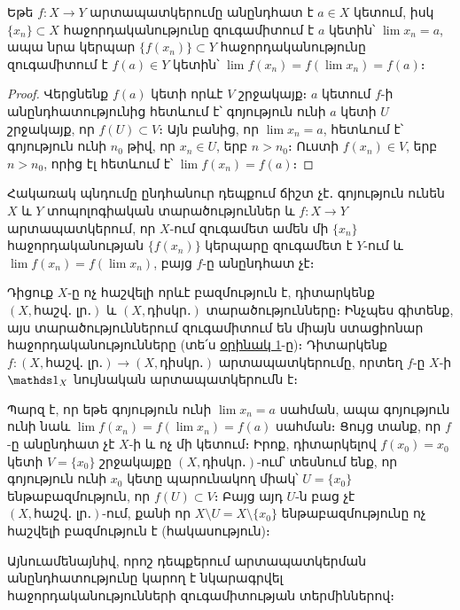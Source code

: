 \documentclass[./main.tex]{subfiles}
\begin{document}
\begin{theorem}\label{ch10thm5} 
Եթե $f:X\rightarrow Y$ արտապատկերումը անընդհատ է $a\in X$ կետում, իսկ $\{x_n\}\subset X$ հաջորդականությունը զուգամիտում է $a$ կետին՝ $\lim x_n=a$, ապա նրա կերպար $\{f(x_n)\}\subset Y$ հաջորդականությունը զուգամիտում է $f(a)\in Y$ կետին՝ $\lim f(x_n) = f\left(\lim x_n\right)=f(a)$։
\end{theorem}

\begin{proof} 
Վերցնենք $f(a)$ կետի որևէ $V$ շրջակայք։ $a$ կետում $f$-ի անընդ\-հա\-տու\-թ\-յու\-նից հետևում է՝ գոյություն ունի $a$ կետի $U$ շրջակայք, որ $f(U)\subset V$։ Այն բանից, որ $\lim x_n=a$, հետևում է՝ գոյություն ունի $n_0$ թիվ, որ $x_n\in U$, երբ $n>n_0$։ Ուստի $f(x_n)\in V$, երբ $n>n_0$, որից էլ հետևում է՝ $\lim f(x_n)=f(a)$։
\end{proof} 

\par Հակառակ պնդումը ընդհանուր դեպքում ճիշտ չէ․ գոյություն ունեն $X$ և $Y$ տո\-պո\-լո\-գիական տարածություններ և $f:X\rightarrow Y$ արտապատկերում, որ $X$-ում զուգա\-մետ ամեն մի $\{x_n\}$ հաջորդականության $\{f(x_n)\}$ կերպարը զուգամետ է $Y$-ում և $\lim f(x_n)=f(\lim x_n)$, բայց $f$-ը անընդհատ չէ։

\begin{example}\label{ch10ex3} 
Դիցուք $X$-ը ոչ հաշվելի որևէ բազմություն է, դիտարկենք $(X, \textrm{հաշվ․ լր․})$ և $(X, \textrm{դիսկր․})$ տարա\-ծութ\-յուն\-ները։ Ինչպես գիտենք, այս տա\-րա\-ծութ\-յուն\-նե\-րում զու\-գամիտում են միայն ստացիոնար հաջորդականությունները (տե՛ս \hyperref[ch10ex1]{օրինակ 1}-ը)։ Դի\-տար\-կենք $f:(X, \textrm{հաշվ․ լր․}) \rightarrow(X, \textrm{դիսկր․})$ արտապատկերումը, որտեղ $f\textrm{-ը}$ $X$-ի $\nuynakan_X$ նույնական արտապատկերումն է։

\par Պարզ է, որ եթե գոյություն ունի $\lim x_n=a$ սահման, ապա գոյություն ունի նաև $\lim f(x_n)=f(\lim x_n)=f(a)$ սահման։ Ցույց տանք, որ $f$-ը անընդհատ չէ $X$-ի և ոչ մի կետում։ Իրոք, դիտարկելով $f(x_0)=x_0$ կետի $V=\{x_0\}$ շրջակայքը $(X, \textrm{դիսկր․})$-ում՝ տեսնում ենք, որ գոյություն ունի $x_0$ կետը պարունակող միակ՝ \linebreak $U=\{x_0\}$ ենթաբազմություն, որ $f(U)\subset V$։ Բայց այդ $U$-ն բաց չէ $(X, \textrm{հաշվ․ լր․})$-ում, քանի որ $X\setminus U=X\setminus \{x_0\}$ ենթաբազմությունը ոչ հաշվելի բազմություն է (հա\-կա\-սու\-թյուն)։
\end{example}

\par Այնուամենայնիվ, որոշ դեպքերում արտապատկերման անընդհատությունը կա\-րող է նկարագրվել հաջորդականությունների զուգամիտության տերմիններով։
\end{document}
